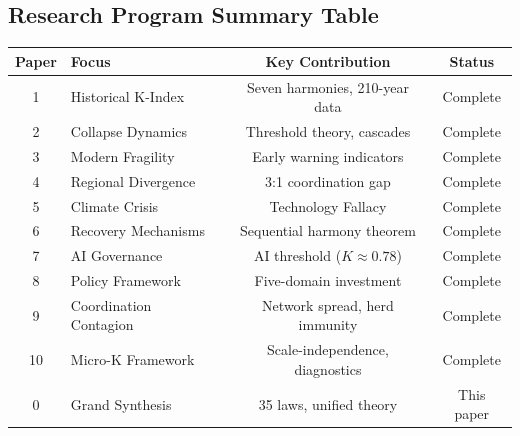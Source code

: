 \documentclass[12pt,letterpaper]{article}
\begin{document}
\subsection{Research Program Summary Table}

\begin{table}[H]
\centering
\begin{tabular}{clcc}
\toprule
\textbf{Paper} & \textbf{Focus} & \textbf{Key Contribution} & \textbf{Status} \\
\midrule
1 & Historical K-Index & Seven harmonies, 210-year data & Complete \\
2 & Collapse Dynamics & Threshold theory, cascades & Complete \\
3 & Modern Fragility & Early warning indicators & Complete \\
4 & Regional Divergence & 3:1 coordination gap & Complete \\
5 & Climate Crisis & Technology Fallacy & Complete \\
6 & Recovery Mechanisms & Sequential harmony theorem & Complete \\
7 & AI Governance & AI threshold ($K \approx 0.78$) & Complete \\
8 & Policy Framework & Five-domain investment & Complete \\
\midrule
9 & Coordination Contagion & Network spread, herd immunity & Complete \\
10 & Micro-K Framework & Scale-independence, diagnostics & Complete \\
\midrule
0 & Grand Synthesis & 35 laws, unified theory & This paper \\
\bottomrule
\end{tabular}
\end{table}




\end{document}
